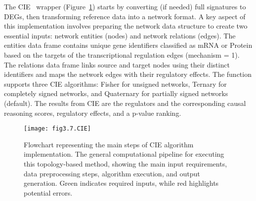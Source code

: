 The \gls{CIE}~\cite{RN81} wrapper (Figure~\ref{fig:fig3.7.CIE}) starts by converting (if needed) full signatures to \gls{DEGs}, then transforming reference data into a network format.
A key aspect of this implementation involves preparing the network data structure to create two essential inputs: network entities (nodes) and network relations (edges).
The entities data frame contains unique gene identifiers classified as \gls{mRNA} or Protein based on the targets of the transcriptional regulation edges (mechanism = 1).
The relations data frame links source and target nodes using their distinct identifiers and maps the network edges with their regulatory effects.
The function supports three \gls{CIE} algorithms: Fisher for unsigned networks, Ternary for completely signed networks, and Quaternary for partially signed networks (default).
The results from \gls{CIE} are the regulators and the corresponding causal reasoning scores, regulatory effects, and a p-value ranking.

\begin{figure}[htbp]
    \centering
    \texttt{[image: fig3.7.CIE]}
    \caption[Flowchart representing the main steps of CIE algorithm implementation.]{Flowchart representing the main steps of \gls{CIE} algorithm implementation. The general computational pipeline for executing this topology-based method, showing the main input requirements, data preprocessing steps, algorithm execution, and output generation. Green indicates required inputs, while red highlights potential errors.}
    \label{fig:fig3.7.CIE}
\end{figure}

